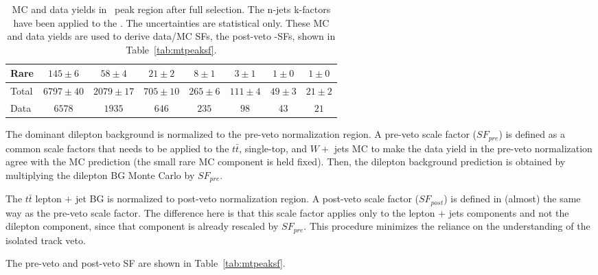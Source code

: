 \begin{table}[!h]
\begin{center}
\begin{tabular}{l||c|c|c|c|c|c|c}
Rare 		 & $145 \pm 6$& $58 \pm 4$& $21 \pm 2$& $8 \pm 1$& $3 \pm 1$& $1 \pm 0$& $1 \pm 0$ \\
\hline
Total 		 & $6797 \pm 40$& $2079 \pm 17$& $705 \pm 10$& $265 \pm 6$& $111 \pm 4$& $49 \pm 3$& $21 \pm 2$ \\
\hline
\hline
Data 		 & $6578$& $1935$& $646$& $235$& $98$& $43$& $21$ \\
\hline
\end{tabular}
\caption{ MC and data yields in \mt\ peak region after full selection. The
  n-jets k-factors have been applied to the \ttdl. The uncertainties
  are statistical only.
  These MC and data yields are used to derive data/MC SFs, the post-veto \mt-SFs, shown in Table~\ref{tab:mtpeaksf}.
\label{tab:mtpeakyields}}
\end{center}
\end{table}

\clearpage

The dominant dilepton background is normalized to the pre-veto normalization
region.  A pre-veto scale factor ($SF_{pre}$) is defined as a common scale
factors that needs to be applied to the $t\bar{t}$, single-top, and 
$W +$ jets
MC to make the data yield in the pre-veto normalization agree with
the MC prediction (the small rare MC component is held fixed).
Then, the dilepton background prediction is obtained by multiplying the
dilepton BG Monte Carlo by $SF_{pre}$.

The $t\bar{t}$ lepton $+$ jet BG is normalized to post-veto 
normalization region.  A post-veto scale factor  ($SF_{post}$) 
is defined in (almost) the same way as the pre-veto scale factor.
The difference here is that this scale factor applies only to 
the lepton $+$ jets components and not the dilepton component,
since that component is already rescaled by $SF_{pre}$.  
This procedure minimizes the reliance on the understanding of 
the isolated track veto.

The pre-veto and post-veto SF are shown in Table~\ref{tab:mtpeaksf}.


